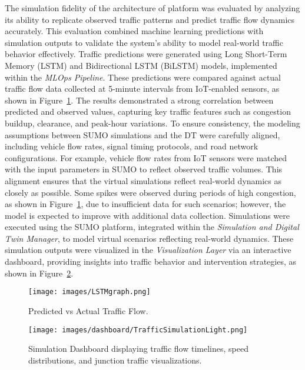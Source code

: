 The simulation fidelity of the architecture of \digit platform was evaluated by analyzing its ability to replicate observed traffic patterns and predict traffic flow dynamics accurately. This evaluation combined machine learning predictions with simulation outputs to validate the system’s ability to model real-world traffic behavior effectively. Traffic predictions were generated using Long Short-Term Memory (LSTM) and Bidirectional LSTM (BiLSTM) models, implemented within the \textit{MLOps Pipeline}. These predictions were compared against actual traffic flow data collected at 5-minute intervals from IoT-enabled sensors, as shown in Figure~\ref{fig:pred_vs_actual}. The results demonstrated a strong correlation between predicted and observed values, capturing key traffic features such as congestion buildup, clearance, and peak-hour variations. To ensure consistency, the modeling assumptions between SUMO simulations and the DT were carefully aligned, including vehicle flow rates, signal timing protocols, and road network configurations. For example, vehicle flow rates from IoT sensors were matched with the input parameters in SUMO to reflect observed traffic volumes. This alignment ensures that the virtual simulations reflect real-world dynamics as closely as possible. Some spikes were observed during periods of high congestion, as shown in Figure~\ref{fig:pred_vs_actual}, due to insufficient data for such scenarios; however, the model is expected to improve with additional data collection. Simulations were executed using the SUMO platform, integrated within the \textit{Simulation and Digital Twin Manager}, to model virtual scenarios reflecting real-world dynamics. These simulation outputs were visualized in the \textit{Visualization Layer} via an interactive dashboard, providing insights into traffic behavior and intervention strategies, as shown in Figure~\ref{fig:simulation_dashboard}.

\begin{figure}[ht!]
    \centering
    \texttt{[image: images/LSTMgraph.png]}
    \caption{Predicted vs Actual Traffic Flow.}
    \label{fig:pred_vs_actual}
\end{figure}

\begin{figure}[ht!]
    \centering
    \texttt{[image: images/dashboard/TrafficSimulationLight.png]}
    \caption{Simulation Dashboard displaying traffic flow timelines, speed distributions, and junction traffic visualizations.}
    \label{fig:simulation_dashboard}
\end{figure}


